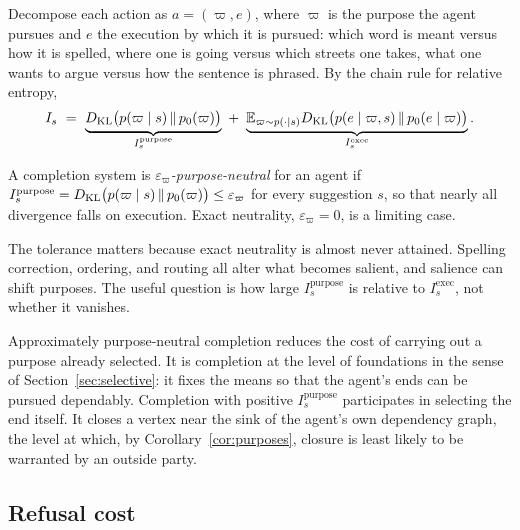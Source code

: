 Decompose each action as $a=(\varpi,e)$, where $\varpi$ is the purpose the agent pursues and $e$ the execution by which it is pursued: which word is meant versus how it is spelled, where one is going versus which streets one takes, what one wants to argue versus how the sentence is phrased. By the chain rule for relative entropy,
\begin{equation}\label{eq:chain}
I_s\ =\ \underbrace{\KL\big(p(\varpi\mid s)\,\|\,p_0(\varpi)\big)}_{I_s^{\mathrm{purpose}}}\ +\ \underbrace{\E_{\varpi\sim p(\cdot\mid s)}\KL\big(p(e\mid\varpi,s)\,\|\,p_0(e\mid\varpi)\big)}_{I_s^{\mathrm{exec}}}.
\end{equation}

\begin{definition}
A completion system is \emph{$\varepsilon_\varpi$-purpose-neutral} for an agent if $I_s^{\mathrm{purpose}}=D_{\mathrm{KL}}\big(p(\varpi\mid s)\,\|\,p_0(\varpi)\big)\leq\varepsilon_\varpi$ for every suggestion $s$, so that nearly all divergence falls on execution. Exact neutrality, $\varepsilon_\varpi=0$, is a limiting case.
\end{definition}

The tolerance matters because exact neutrality is almost never attained. Spelling correction, ordering, and routing all alter what becomes salient, and salience can shift purposes. The useful question is how large $I_s^{\mathrm{purpose}}$ is relative to $I_s^{\mathrm{exec}}$, not whether it vanishes.

Approximately purpose-neutral completion reduces the cost of carrying out a purpose already selected. It is completion at the level of foundations in the sense of Section~\ref{sec:selective}: it fixes the means so that the agent's ends can be pursued dependably. Completion with positive $I_s^{\mathrm{purpose}}$ participates in selecting the end itself. It closes a vertex near the sink of the agent's own dependency graph, the level at which, by Corollary~\ref{cor:purposes}, closure is least likely to be warranted by an outside party.

\subsection{Refusal cost}

